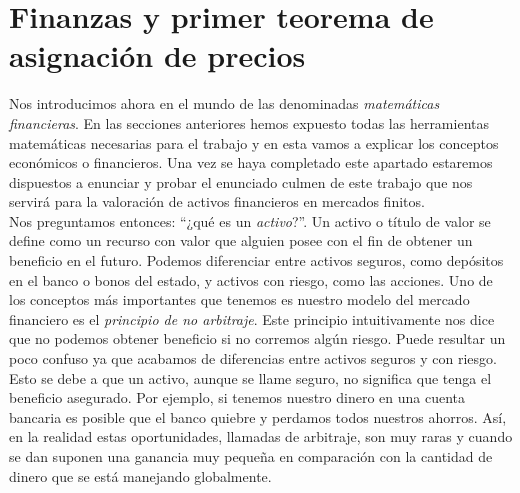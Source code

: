 \chapter{Finanzas y primer teorema de asignación de precios}

Nos introducimos ahora en el mundo de las denominadas \textit{matemáticas financieras}. En las secciones anteriores hemos expuesto todas las herramientas matemáticas necesarias para el trabajo y en esta vamos a explicar los conceptos económicos o financieros. Una vez se haya completado este apartado estaremos dispuestos a enunciar y probar el enunciado culmen de este trabajo que nos servirá para la valoración de activos financieros en mercados finitos. \\

Nos preguntamos entonces: ``¿qué es un \textit{activo}?''. Un activo o título de valor se define como un recurso con valor que alguien posee con el fin de obtener un beneficio en el futuro. Podemos diferenciar entre activos seguros, como depósitos en el banco o bonos del estado, y activos con riesgo, como las acciones. Uno de los conceptos más importantes que tenemos es nuestro modelo del mercado financiero es el \textit{principio de no arbitraje}. Este principio intuitivamente nos dice que no podemos obtener beneficio si no corremos algún riesgo. Puede resultar un poco confuso ya que acabamos de diferencias entre activos seguros y con riesgo. Esto se debe a que un activo, aunque se llame seguro, no significa que tenga el  beneficio asegurado. Por ejemplo, si tenemos nuestro dinero en una cuenta bancaria es posible que el banco quiebre y perdamos todos nuestros ahorros. Así, en la realidad estas oportunidades, llamadas de arbitraje, son muy raras y cuando se dan suponen una ganancia muy pequeña en comparación con la cantidad de dinero que se está manejando globalmente.\\

